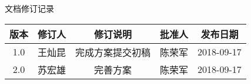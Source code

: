 \newpage
\begin{center}
{\songti \subsubTitle 文档修订记录} \par

\setlength{\arrayrulewidth}{1.2pt} %
\setlength{\tabcolsep}{18pt} %
\renewcommand{\arraystretch}{1.5}  %

\songti\tableText
\begin{tabular}{ |c | c| c| c|  c |}
  \hline
  版本  & 修订人 & 修订说明 & 批准人 & 发布日期 \\
  \hline
  1.0 &  王灿昆 & 完成方案提交初稿 & 陈荣军 & 2018-09-17 \\
  \hline
  2.0 &  苏宏雄 & 完善方案 & 陈荣军 & 2018-09-17 \\
  \hline
\end{tabular}
\end{center}
